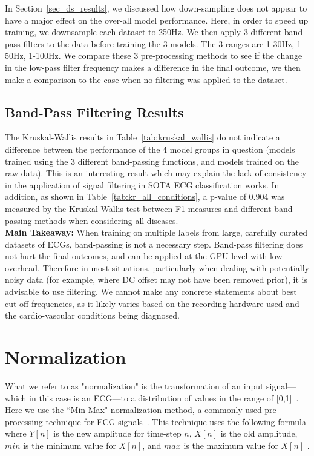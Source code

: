 \documentclass[pmlr,twocolumn]{jmlr}%
\begin{document}
In Section~\ref{sec_ds_results}, we discussed how down-sampling does not appear to have a major effect on the over-all model performance. Here, in order to speed up training, we downsample each dataset to 250Hz. We then apply 3 different band-pass filters to the data before training the 3 models. The 3 ranges are 1-30Hz, 1-50Hz, 1-100Hz. We compare these 3 pre-processing methods to see if the change in the low-pass filter frequency makes a difference in the final outcome, we then make a comparison to the case when no filtering was applied to the dataset. 

\subsection{Band-Pass Filtering Results}
The Kruskal-Wallis results in Table~\ref{tab:kruskal_wallis} do not indicate a difference between the performance of the 4 model groups in question (models trained using the 3 different band-passing functions, and models trained on the raw data). This is an interesting result which may explain the lack of consistency in the application of signal filtering in SOTA ECG classification works. In addition, as shown in Table~\ref{tab:kr_all_conditions}, a p-value of 0.904 was measured by the Kruskal-Wallis test between F1 measures and different band-passing methods when considering all diseases. 
\\
\textbf{Main Takeaway:} When training on multiple labels from large, carefully curated datasets of ECGs, band-passing is not a necessary step. Band-pass filtering does not hurt the final outcomes, and can be applied at the GPU level with low overhead. Therefore in most situations, particularly when dealing with potentially noisy data (for example, where DC offset may not have been removed prior), it is advisable to use filtering. We cannot make any concrete statements about best cut-off frequencies, as it likely varies based on the recording hardware used and the cardio-vascular conditions being diagnosed. 

\section{Normalization}
\label{sec:Norm}
What we refer to as "normalization" is the transformation of an input signal---which in this case is an ECG---to a distribution of values in the range of [0,1]~\citep{hong2022practical}. Here we use the ``Min-Max" normalization method, a commonly used pre-processing technique for ECG signals~\citep{uwaechia2021comprehensive,li2010robust,li2019identifying,fang2009human}. This technique uses the following formula where $Y[n]$ is the new amplitude for time-step $n$, $X[n]$ is the old amplitude, $min$ is the minimum value for $X[n]$, and $max$ is the maximum value for $X[n]$ \citep{uwaechia2021comprehensive}.
\end{document}
